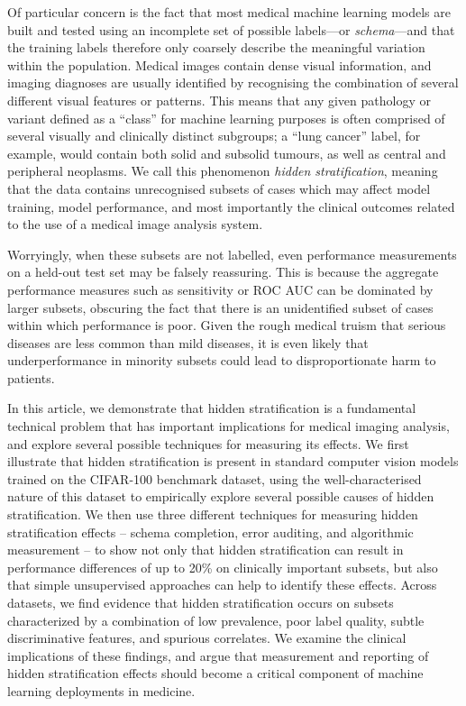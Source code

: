 \documentclass{article}
\begin{document}
Of particular concern is the fact that most medical machine learning models are built and tested using an incomplete set of possible labels---or \textit{schema}---and that the training labels therefore only coarsely describe the meaningful variation within the population. 
Medical images contain dense visual information, and imaging diagnoses are usually identified by recognising the combination of several different visual features or patterns. 
This means that any given pathology or variant defined as a ``class'' for machine learning purposes is often comprised of several visually and clinically distinct subgroups; a ``lung cancer'' label, for example, would contain both solid and subsolid tumours, as well as central and peripheral neoplasms. 
We call this phenomenon \textit{hidden stratification}, meaning that the data contains unrecognised subsets of cases which may affect model training, model performance, and most importantly the clinical outcomes related to the use of a medical image analysis system.  

Worryingly, when these subsets are not labelled, even performance measurements on a held-out test set may be falsely reassuring. 
This is because the aggregate performance measures such as sensitivity or ROC AUC can be dominated by larger subsets, obscuring the fact that there is an unidentified subset of cases within which performance is poor. 
Given the rough medical truism that serious diseases are less common than mild diseases, it is even likely that underperformance in minority subsets could lead to disproportionate harm to patients.

In this article, we demonstrate that hidden stratification is a fundamental technical problem that has important implications for medical imaging analysis, and explore several possible techniques for measuring its effects. 
We first illustrate that hidden stratification is present in standard computer vision models trained on the CIFAR-100 benchmark dataset, using the well-characterised nature of this dataset to empirically explore several possible causes of hidden stratification.
We then use three different techniques for measuring hidden stratification effects -- schema completion, error auditing, and algorithmic measurement -- to show not only that hidden stratification can result in performance differences of up to 20\% on clinically important subsets, but also that simple unsupervised approaches can help to identify these effects.  
Across datasets, we find evidence that hidden stratification occurs on subsets characterized by a combination of low prevalence, poor label quality, subtle discriminative features, and spurious correlates. 
We examine the clinical implications of these findings, and argue that measurement and reporting of hidden stratification effects should become a critical component of machine learning deployments in medicine.
\end{document}
